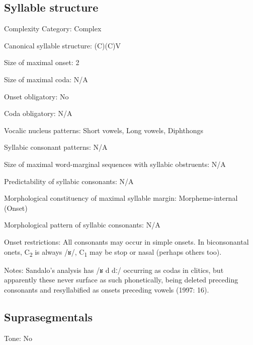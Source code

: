 {\subsection*{Syllable structure}
\begin{appendixdesc}

\item[Complexity Category:] Complex

\item[Canonical syllable structure:] (C)(C)V \citep[17--18]{Sandalo1997}

\item[Size of maximal onset:] 2

\item[Size of maximal coda:] N/A

\item[Onset obligatory:] No

\item[Coda obligatory:] N/A

\item[Vocalic nucleus patterns:] Short vowels, Long vowels, Diphthongs

\item[Syllabic consonant patterns:] N/A

\item[Size of maximal word-marginal sequences with syllabic obstruents:] N/A

\item[Predictability of syllabic consonants:] N/A

\item[Morphological constituency of maximal syllable margin:] Morpheme-internal (Onset)

\item[Morphological pattern of syllabic consonants:] N/A

\item[Onset restrictions:] All consonants may occur in simple onsets. In biconsonantal onets, C\textsubscript{2} is always /ʁ/, C\textsubscript{1} may be stop or nasal (perhaps others too).

\item[Notes:] Sandalo’s analysis has /ʁ d dː/ occurring as codas in clitics, but apparently these never surface as such phonetically, being deleted preceding consonants and resyllabified as onsets preceding vowels (1997: 16).
\end{appendixdesc}
\subsection*{Suprasegmentals}
\begin{appendixdesc}
\item[Tone:] No


\end{appendixdesc}}
